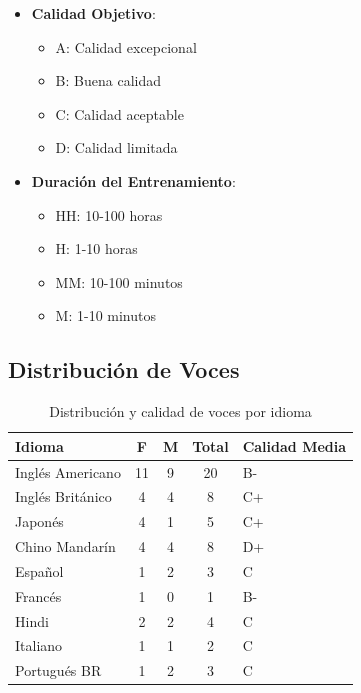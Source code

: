 \begin{itemize}
	\item \textbf{Calidad Objetivo}:
	      \begin{itemize}
		      \item A: Calidad excepcional
		      \item B: Buena calidad
		      \item C: Calidad aceptable
		      \item D: Calidad limitada
	      \end{itemize}

	\item \textbf{Duración del Entrenamiento}:
	      \begin{itemize}
		      \item HH: 10-100 horas
		      \item H: 1-10 horas
		      \item MM: 10-100 minutos
		      \item M: 1-10 minutos
	      \end{itemize}
\end{itemize}

\subsection{Distribución de Voces}
\label{subsec:voice-distribution}

\begin{table}[H]
	\centering
	\label{tab:voice-distribution}
	\begin{tabular}{|l|c|c|c|l|}
		\hline
		\textbf{Idioma}  & \textbf{F} & \textbf{M} & \textbf{Total} & \textbf{Calidad Media} \\
		\hline
		Inglés Americano & 11         & 9          & 20             & B-                     \\
		\hline
		Inglés Británico & 4          & 4          & 8              & C+                     \\
		\hline
		Japonés          & 4          & 1          & 5              & C+                     \\
		\hline
		Chino Mandarín   & 4          & 4          & 8              & D+                     \\
		\hline
		Español          & 1          & 2          & 3              & C                      \\
		\hline
		Francés          & 1          & 0          & 1              & B-                     \\
		\hline
		Hindi            & 2          & 2          & 4              & C                      \\
		\hline
		Italiano         & 1          & 1          & 2              & C                      \\
		\hline
		Portugués BR     & 1          & 2          & 3              & C                      \\
		\hline
	\end{tabular}
	\caption{Distribución y calidad de voces por idioma}
\end{table}

